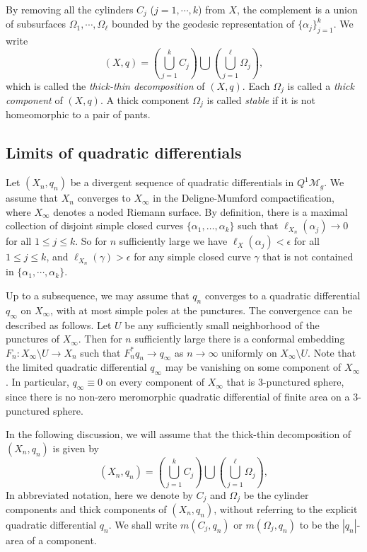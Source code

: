 \documentclass{amsart}
\theoremstyle{plain}
\theoremstyle{definition}
\numberwithin{equation}{section}
\begin{document}
By removing all the cylinders $C_{j}$ ($j=1,\cdots, k$) from $X$,  the complement is a union of subsurfaces $\Omega_1, \cdots, \Omega_\ell$ bounded by the geodesic representation of $\{\alpha_j\}_{j=1}^k$. We write
$$(X, q) = \left( \bigcup_{j=1}^k C_j \right) \bigcup  \left( \bigcup_{j=1}^\ell \Omega_j \right),$$
which is called the \emph{thick-thin decomposition} of $(X, q)$. 
Each $\Omega_j$ is called a \emph{thick component} of $(X, q)$.
A thick component  $\Omega_j$ is called \emph{stable} if it is  not homeomorphic to a pair of pants. 


\subsection{Limits of  quadratic differentials} 
Let $(X_n, q_n)$ be a divergent sequence of quadratic differentials in $ Q^1\mathcal{M}_g$.
We assume that
$X_n$ converges to $X_\infty$ in the Deligne-Mumford compactification, 
where $X_\infty$ denotes a noded Riemann surface.
By definition, there is a maximal collection of disjoint simple closed curves 
$\{\alpha_1,\ldots,\alpha_k\}$ 
such that $\ell_{X_n}(\alpha_j) \to 0$ for all $1\leq j\leq k$. So for $n$ sufficiently large we have $\ell_{X}(\alpha_j) < \epsilon$ for all $1\leq j\leq k$,
and $\ell_{X_n}(\gamma) > \epsilon$ for any simple closed curve $\gamma$
 that is not contained in $\{\alpha_1, \cdots, \alpha_k\}$. 



Up to a subsequence, we may assume that $q_n$ converges to  
a quadratic differential $q_\infty$ on $X_\infty$, with at most simple poles at the punctures. The convergence can be described as follows. 
Let $U$ be any sufficiently small neighborhood of the punctures of $X_\infty$. 
Then for $n$ sufficiently large there is a conformal embedding $F_n : X_\infty \setminus U \to X_n$ such that $F_n^* q_n \to q_\infty$ as $n\to \infty$ uniformly on $X_\infty \setminus U$. Note that the limited quadratic differential $q_\infty$ may be vanishing on some component of $X_\infty$. In particular, $q_\infty \equiv 0$
on every component of $X_\infty$ that is $3$-punctured sphere, since there is no non-zero meromorphic   quadratic differential of finite area on a  $3$-punctured sphere.

In the following discussion, we will assume that the thick-thin decomposition of $(X_n, q_n)$ is given by
$$(X_n, q_n) = \left( \bigcup_{j=1}^k C_j \right) \bigcup  \left( \bigcup_{j=1}^\ell \Omega_j \right),$$
 In abbreviated notation, here we denote by $C_j$ and $\Omega_j$ be the cylinder components and thick components of $(X_n, q_n)$, without referring to the explicit quadratic differential $q_n$. We shall write $m(C_j, q_n)$ or $m(\Omega_j, q_n)$
 to be the $|q_n|$-area of a component. 
 
\end{document}
